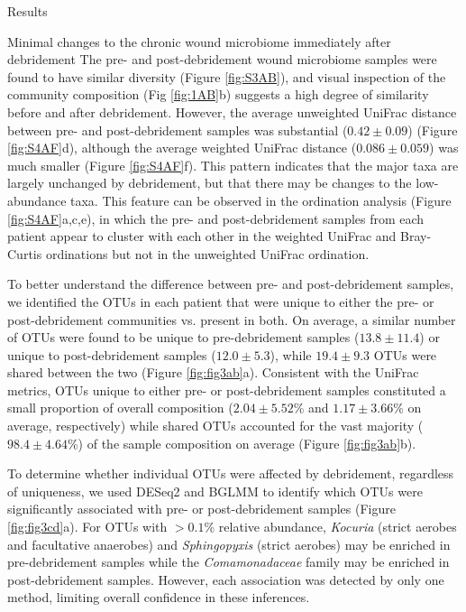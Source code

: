 \documentclass[oneside,12pt,final]{sty/ucthesis-CA2012}
\begin{document}
\begin{mainmatter}
\begin{section}{Results}
\begin{subsection}{Minimal changes to the chronic wound microbiome immediately after debridement}
The pre- and post-debridement wound microbiome samples were found to have similar diversity (Figure \ref{fig:S3AB}), and visual inspection of the community composition (Fig \ref{fig:1AB}b) suggests a high degree of similarity before and after debridement. However, the average unweighted UniFrac distance between pre- and post-debridement samples was substantial ($0.42\pm0.09$) (Figure \ref{fig:S4AF}d), although the average weighted UniFrac distance ($0.086\pm0.059$) was much smaller (Figure \ref{fig:S4AF}f). This pattern indicates that the major taxa are largely unchanged by debridement, but that there may be changes to the low-abundance taxa. This feature can be observed in the ordination analysis (Figure \ref{fig:S4AF}a,c,e), in which the pre- and post-debridement samples from each patient appear to cluster with each other in the weighted UniFrac and Bray-Curtis ordinations but not in the unweighted UniFrac ordination. 

To better understand the difference between pre- and post-debridement samples, we identified the OTUs in each patient that were unique to either the pre- or post-debridement communities vs. present in both. On average, a similar number of OTUs were found to be unique to pre-debridement samples ($13.8 \pm 11.4$) or unique to post-debridement samples ($12.0\pm5.3$), while $19.4\pm9.3$ OTUs were shared between the two (Figure \ref{fig:fig3ab}a). Consistent with the UniFrac metrics, OTUs unique to either pre- or post-debridement samples constituted a small proportion of overall composition ($2.04\pm5.52$\% and $1.17\pm3.66$\% on average, respectively) while shared OTUs accounted for the vast majority ($98.4\pm4.64$\%) of the sample composition on average (Figure \ref{fig:fig3ab}b). 

To determine whether individual OTUs were affected by debridement, regardless of uniqueness, we used DESeq2 and BGLMM to identify which OTUs were significantly associated with pre- or post-debridement samples (Figure \ref{fig:fig3cd}a). For OTUs with $> 0.1$\% relative abundance, \textit{Kocuria} (strict aerobes and facultative anaerobes) and \textit{Sphingopyxis} (strict aerobes) may be enriched in pre-debridement samples while the \textit{Comamonadaceae} family may be enriched in post-debridement samples. However, each association was detected by only one method, limiting overall confidence in these inferences.


\end{subsection}
\end{section}
\end{mainmatter}
\end{document}
